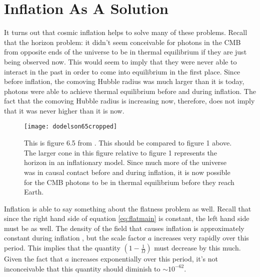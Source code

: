\documentclass[aps,reprint,prl]{revtex4-1}
\begin{document}
\section*{Inflation As A Solution}
It turns out that cosmic inflation helps to solve many of these problems.  Recall that the horizon problem: it didn't seem conceivable for photons in the CMB from opposite ends of the universe to be in thermal equilibrium if they are just being observed now.  This would seem to imply that they were never able to interact in the past in order to come into equilibrium in the first place.  Since before inflation, the comoving Hubble radius was much larger than it is today, photons were able to achieve thermal equilibrium before and during inflation.  The fact that the comoving Hubble radius is increasing now, therefore, does not imply that it was never higher than it is now.\\
\begin{figure}[h]
\texttt{[image: dodelson65cropped]}
\caption{This is figure 6.5 from \cite{Dodelson}.  This should be compared to figure 1 above.  The larger cone in this figure relative to figure 1 represents the horizon in an inflationary model.  Since much more of the universe was in causal contact before and during inflation, it is now possible for the CMB photons to be in thermal equilibrium before they reach Earth.}
\end{figure}
\indent Inflation is able to say something about the flatness problem as well.  Recall that since the right hand side of equation \ref{eq:flatmain} is constant, the left hand side must be as well.  The density of the field that causes inflation is approximately constant during inflation \cite{wiki:flatness}, but the scale factor $a$ increases very rapidly over this period.  This implies that the quantity $\left(1-\frac{1}{\Omega}\right)$ must decrease by this much.  Given the fact that $a$ increases exponentially over this period, it's not inconceivable that this quantity should diminish to $\sim10^{-62}$. \\
\end{document}
